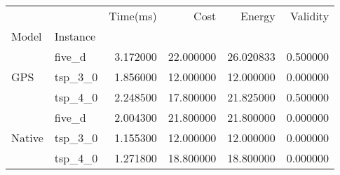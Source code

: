 \begin{tabular}{llrrrr}
\toprule
 &  & Time(ms) & Cost & Energy & Validity \\
Model & Instance &  &  &  &  \\
\midrule
\multirow[t]{3}{*}{GPS} & five_d & 3.172000 & 22.000000 & 26.020833 & 0.500000 \\
 & tsp_3_0 & 1.856000 & 12.000000 & 12.000000 & 0.000000 \\
 & tsp_4_0 & 2.248500 & 17.800000 & 21.825000 & 0.500000 \\
\cline{1-6}
\multirow[t]{3}{*}{Native} & five_d & 2.004300 & 21.800000 & 21.800000 & 0.000000 \\
 & tsp_3_0 & 1.155300 & 12.000000 & 12.000000 & 0.000000 \\
 & tsp_4_0 & 1.271800 & 18.800000 & 18.800000 & 0.000000 \\
\cline{1-6}
\bottomrule
\end{tabular}
